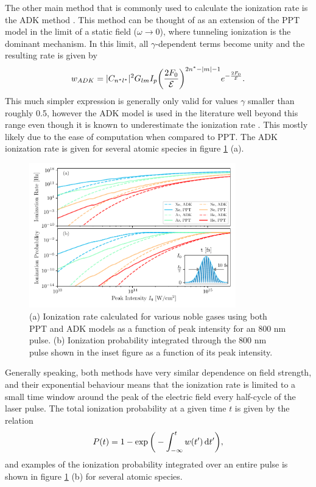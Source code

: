 The other main method that is commonly used to calculate the ionization rate is the ADK method \cite{ammosovTunnelIonizationComplex1966}.  This method can be thought of as an extension of the PPT model in the limit of a static field ($\omega\rightarrow0$), where tunneling ionization is the dominant mechanism.  In this limit, all $\gamma$-dependent terms become unity and the resulting rate is given by
\begin{equation}
\label{eqn:ADK_rate}
	w_{ADK} = \lvert C_{n^*l^*} \rvert^2 G_{lm} I_p \bigg( \frac{2F_0}{\mathcal{E}} \bigg) ^{2n^*-\lvert m \rvert -1} e^{-\frac{2F_0}{\mathcal{E}}}.
\end{equation}
This much simpler expression is generally only valid for values $\gamma$ smaller than roughly 0.5, however the ADK model is used in the literature well  beyond this range even though it is known to underestimate the ionization rate \cite{laiExperimentalInvestigationStrongfieldionization2017}.  This mostly likely due to the ease of computation when compared to PPT.  The ADK ionization rate is given for several atomic species in figure \ref{fig:adk_ppt} (a).
\begin{figure}
	\centering
	\includegraphics[width=0.8\textwidth]{figures/ATS/ADK_PPT.pdf}
	\caption[ADK and PPT ionization of noble gases]{(a) Ionization rate calculated for various noble gases using both PPT and ADK models as a function of peak intensity for an 800 nm pulse.  (b) Ionization probability integrated through the 800 nm pulse shown in the inset figure as a function of its peak intensity.}
	\label{fig:adk_ppt}
\end{figure}

Generally speaking, both methods have very similar dependence on field strength, and their exponential behaviour means that the ionization rate is limited to a small time window around the peak of the electric field every half-cycle of the laser pulse.  The total ionization probability at a given time $t$ is given by the relation
\begin{equation}
\label{eqn:ion_prob}
	P(t)=1-\exp\bigg(-\int_{-\infty}^{t}w(t')\mathop{}\!\mathrm{d} t'\bigg),
\end{equation}
and examples of the ionization probability integrated over an entire pulse is shown in figure \ref{fig:adk_ppt} (b) for several atomic species.

